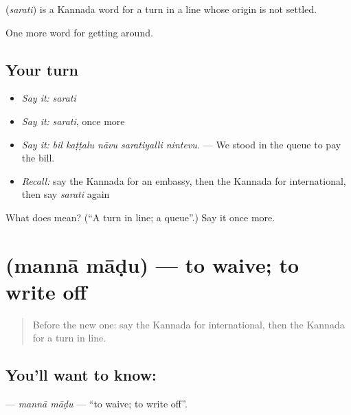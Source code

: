\begin{cousinweb}
\textbf{} (\emph{sarati}) is a Kannada word for a turn in a line whose origin is not settled.
\end{cousinweb}

\begin{grammarlens}[title={What you've built}]
One more word for getting around.
\end{grammarlens}

\subsection*{Your turn}
\begin{itemize}
\raggedright
  \item \emph{Say it:} \emph{sarati}
  \item \emph{Say it:} \emph{sarati}, once more
  \item \emph{Say it:} \emph{bil kaṭṭalu nāvu saratiyalli nintevu.} — We stood in the queue to pay the bill.
  \item \emph{Recall:} say the Kannada for an embassy, then the Kannada for international, then say \emph{sarati} again
\end{itemize}

\begin{tcolorbox}[breakable,colback=teal!4,colframe=teal!35!black,title={Before you move on}]
What does  mean? (\textquotedblleft{}A turn in line; a queue\textquotedblright{}.) Say it once more.
\end{tcolorbox}
\section[\texorpdfstring{\kn{ಮನ್ನಾ} \kn{ಮಾಡು} (mannā māḍu)}{ಮನ್ನಾ ಮಾಡು (mannā māḍu)}]{  (mannā māḍu) — to waive; to write off}

\label{lesson:KA-C441-manna-madu}



\begin{quote}
Before the new one: say the Kannada for international, then the Kannada for a turn in line.
\end{quote}

\subsection*{You'll want to know:  }
\textbf{ } — \emph{mannā māḍu} — \textquotedblleft{}to waive; to write off\textquotedblright{}.

